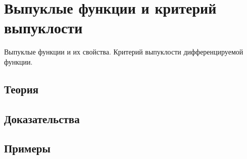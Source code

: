 
\section{Выпуклые функции и критерий выпуклости}
\label{sec:2.4.03-convex-functions}

\begin{ticket}
Выпуклые функции и их свойства. Критерий выпуклости дифференцируемой функции.
\end{ticket}

\subsection*{Теория}

\subsection*{Доказательства}

\subsection*{Примеры}
